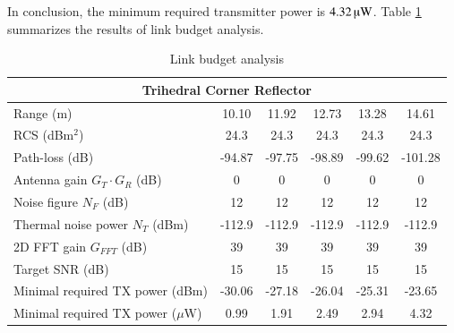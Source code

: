 \documentclass[12pt,DIV14,BCOR12mm,a4paper,footinclude=false,headinclude,parskip=half-,twoside,openright,cleardoublepage=empty,toc=index,bibliography=totoc,listof=totoc]{scrreprt}
\numberwithin{equation}{chapter}
\begin{document}
In conclusion, the minimum required transmitter power is $4.32\,\text{\textmu W}$. Table \ref{link budget analysis table} summarizes the results of link budget analysis.
\begin{table}
    \centering
    \caption{Link budget analysis}
    \label{link budget analysis table}
    \begin{tabular}{cccccc}
        \hline
        \multicolumn{6}{c}{Trihedral Corner Reflector}\\
        \hline
        \multicolumn{1}{l|}{Range (m)} & 10.10 & 11.92 & 12.73 & 13.28 & 14.61\\
        \hline
        \multicolumn{1}{l|}{RCS (dBm$^{2}$)} & 24.3 & 24.3 & 24.3 & 24.3 & 24.3\\
        \multicolumn{1}{l|}{Path-loss (dB)} & -94.87 & -97.75 & -98.89 & -99.62 & -101.28\\
        \multicolumn{1}{l|}{Antenna gain $G_{T} \cdot G_{R}$ (dB)} & 0 & 0 & 0 & 0 & 0\\
        \multicolumn{1}{l|}{Noise figure $N_{F}$ (dB)} & 12 & 12 & 12 & 12 & 12\\
        \multicolumn{1}{l|}{Thermal noise power $N_{T}$ (dBm)} & -112.9 & -112.9 & -112.9 & -112.9 & -112.9\\
        \multicolumn{1}{l|}{2D FFT gain $G_{FFT}$ (dB)} & 39 & 39 & 39 & 39 & 39\\
        \multicolumn{1}{l|}{Target SNR (dB)} & 15 & 15 & 15 & 15 & 15\\
        \multicolumn{1}{l|}{Minimal required TX power (dBm)} & -30.06 & -27.18 & -26.04 & -25.31 & -23.65\\
        \multicolumn{1}{l|}{Minimal required TX power ($\mu \mathrm{W}$)} & 0.99 & 1.91 & 2.49 & 2.94 & 4.32\\
        \hline
    \end{tabular}
\end{table}
\end{document}
